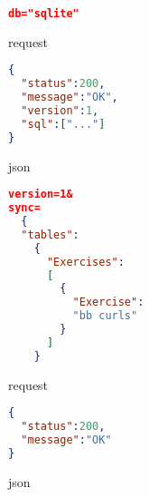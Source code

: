 


\begin{figure}[h!]
\begin{subfigure}[b]{0.23\textwidth}
\begin{lstlisting}[language=json]
db="sqlite"
\end{lstlisting}
\caption{request}
\label{fig:gull}
\end{subfigure}%
\begin{subfigure}[b]{0.27\textwidth}
\begin{lstlisting}[language=json]
{
  "status":200,
  "message":"OK",
  "version":1,
  "sql":["..."]
}
\end{lstlisting}
\caption{json}
\label{fig:tiger}
\end{subfigure}
\caption{\schema}
\label{fig:animals} \end{figure}




\begin{figure}[h!]
\begin{subfigure}[b]{0.23\textwidth}
\begin{lstlisting}[language=json]
version=1&
sync=
  {
  "tables":
    {
      "Exercises":
      [
        {
          "Exercise":
          "bb curls"
        }
      ]
    }
\end{lstlisting}
\caption{request}
\label{fig:gull}
\end{subfigure}%
\begin{subfigure}[b]{0.27\textwidth}
\begin{lstlisting}[language=json]
{
  "status":200,
  "message":"OK"
}
\end{lstlisting}
\caption{json}
\label{fig:tiger}
\end{subfigure}
\caption{\create}
\label{fig:animals} \end{figure}






